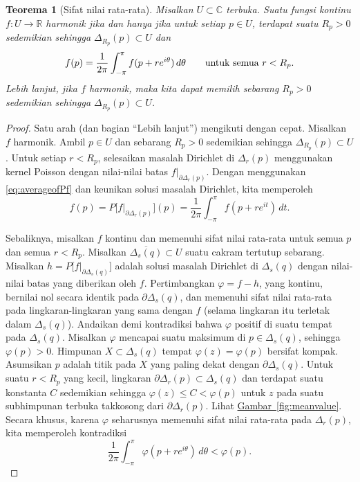 \documentclass[12pt,openany]{book}
\newcommand{\avoidbreak}{\postdisplaypenalty=100}
\newcommand{\C}{{\mathbb{C}}}
\newcommand{\R}{{\mathbb{R}}}
\newcommand{\myquote}[1]{``#1''}
\theoremstyle{plain}
\newtheorem{thm}{Teorema}[section]
\theoremstyle{remark}
\theoremstyle{definition}
\theoremstyle{exercise}
\theoremstyle{example}
\newcommand{\figureref}[1]{\hyperref[#1]{Gambar~\ref*{#1}}}
\begin{document}
\begin{thm}[Sifat nilai rata-rata]\label{thm:meanprop}
\pagebreak[0]
Misalkan $U \subset \C$ terbuka.
Suatu fungsi kontinu
$f \colon U \to \R$
harmonik jika dan hanya jika untuk setiap $p \in U$, terdapat suatu $R_p >0$
sedemikian sehingga $\Delta_{R_p}(p) \subset U$ dan
\begin{equation*}
f(p) = \frac{1}{2\pi} \int_{-\pi}^{\pi} f(p+re^{i\theta})\, d\theta
\qquad \text{untuk semua } r < R_p .
\avoidbreak
\end{equation*}
Lebih lanjut, jika $f$ harmonik, maka kita dapat memilih sebarang
$R_p > 0$ sedemikian sehingga $\Delta_{R_p}(p) \subset U$.
\end{thm}

\begin{proof}
Satu arah (dan bagian \myquote{Lebih lanjut}) mengikuti dengan cepat.
Misalkan $f$ harmonik.
Ambil $p \in U$ dan
sebarang $R_p > 0$ sedemikian sehingga $\Delta_{R_p}(p) \subset U$.
Untuk setiap $r < R_p$,
selesaikan masalah Dirichlet di $\Delta_r(p)$ menggunakan kernel Poisson
dengan nilai-nilai batas
$f|_{\partial \Delta_r(p)}$. Dengan menggunakan \eqref{eq:averageofPf} dan
keunikan solusi masalah Dirichlet, kita memperoleh
\begin{equation*}
f(p) = P\bigl[f|_{\partial \Delta_r(p)}\big](p) =
\frac{1}{2\pi} \int_{-\pi}^{\pi}f(p + r e^{it}) \, dt .
\end{equation*}

Sebaliknya, misalkan $f$ kontinu dan memenuhi
sifat nilai rata-rata untuk semua $p$ dan semua $r < R_p$.
Misalkan $\overline{\Delta_s(q)} \subset U$ suatu
cakram tertutup sebarang. Misalkan $h = P\bigl[f|_{\partial \Delta_s(q)}\big]$
adalah solusi masalah Dirichlet di $\Delta_s(q)$ dengan nilai-nilai batas
yang diberikan oleh $f$. Pertimbangkan $\varphi = f-h$,
yang kontinu, bernilai nol secara identik
pada $\partial \Delta_s(q)$, dan memenuhi sifat nilai rata-rata
pada lingkaran-lingkaran yang sama dengan $f$ (selama lingkaran itu terletak dalam $\Delta_s(q)$).
Andaikan demi kontradiksi bahwa $\varphi$ positif
di suatu tempat pada $\Delta_s(q)$.
Misalkan $\varphi$ mencapai suatu maksimum di $p \in
\Delta_s(q)$, sehingga $\varphi(p) > 0$.
Himpunan $X \subset \Delta_s(q)$ tempat $\varphi(z) = \varphi(p)$ bersifat kompak.
Asumsikan $p$ adalah titik pada $X$ yang paling dekat dengan
$\partial \Delta_s(q)$. Untuk suatu $r < R_p$ yang kecil, lingkaran
$\partial \Delta_r(p) \subset \Delta_s(q)$ dan terdapat suatu konstanta
$C$ sedemikian sehingga $\varphi(z) \leq C < \varphi(p)$ untuk $z$
pada suatu subhimpunan terbuka takkosong
dari $\partial \Delta_r(p)$. Lihat \figureref{fig:meanvalue}.
Secara khusus, karena
$\varphi$ seharusnya memenuhi
sifat nilai rata-rata pada $\Delta_r(p)$, kita memperoleh kontradiksi
\begin{equation*}
\frac{1}{2\pi} \int_{-\pi}^{\pi} \varphi(p+re^{i\theta})\, d\theta <
\varphi(p) .
\end{equation*}


\end{proof}
\end{document}
